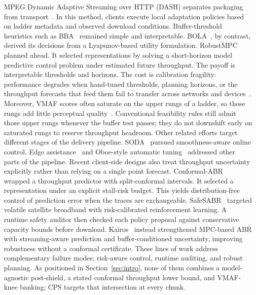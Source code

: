 MPEG Dynamic Adaptive Streaming over HTTP (DASH) separates packaging from transport~\cite{sodagar2011mpeg}.
In this method, clients execute local adaptation policies based on ladder metadata and observed download conditions.
Buffer-threshold heuristics such as BBA~\cite{huang2014buffer} remained simple and interpretable.
BOLA~\cite{spiteri2018bola}, by contrast, derived its decisions from a Lyapunov-based utility formulation.
RobustMPC~\cite{yin2015control} planned ahead.
It selected representations by solving a short-horizon model predictive control problem under estimated future throughput.
The payoff is interpretable thresholds and horizons.
The cost is calibration fragility: performance degrades when hand-tuned thresholds, planning horizons, or the throughput forecasts that feed them fail to transfer across networks and devices~\cite{narayanan2021variegated,cisco2023}.
Moreover, VMAF scores often saturate on the upper rungs of a ladder, so those rungs add little perceptual quality~\cite{li2016vmaf}. Conventional feasibility rules still admit those upper rungs whenever the buffer test passes; they do not downshift early on saturated rungs to reserve throughput headroom.
Other related efforts target different stages of the delivery pipeline.
SODA~\cite{chen2024soda} pursued smoothness-aware online control. Edge assistance~\cite{mehrabi2019edge} and Oboe-style automatic tuning~\cite{akhtar2018oboe} addressed other parts of the pipeline.
Recent client-side designs also treat throughput uncertainty explicitly rather than relying on a single point forecast.
Conformal-ABR~\cite{zhong2026conformalabr} wrapped a throughput predictor with split-conformal intervals. It selected a representation under an explicit stall-risk budget. This yields distribution-free control of prediction error when the traces are exchangeable.
SafeSABR~\cite{liu2025safesabr} targeted volatile satellite broadband with risk-calibrated reinforcement learning. A runtime safety auditor then checked each policy proposal against conservative capacity bounds before download.
Kairos~\cite{zhong2025kairos} instead strengthened MPC-based ABR with streaming-aware prediction and buffer-conditioned uncertainty, improving robustness without a conformal certificate.
These lines of work address complementary failure modes: risk-aware control, runtime auditing, and robust planning.
As positioned in Section~\ref{sec:intro}, none of them combines a model-agnostic post-shield, a stated conformal throughput lower bound, and VMAF-knee banking; CPS targets that intersection at every chunk.

